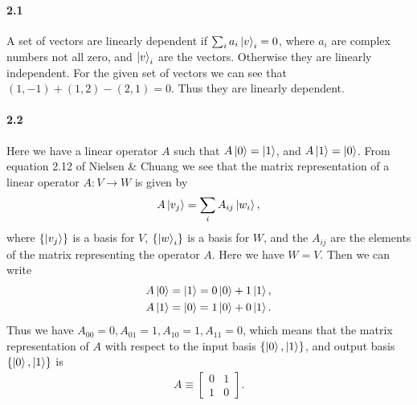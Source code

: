 
\paragraph{2.1}

A set of vectors are linearly dependent if \(\sum_{i} a_i \ket{v}_i = 0\),
where \(a_i\) are complex numbers not all zero, and \(\ket{v}_i\) are the
vectors. Otherwise they are linearly independent. For the given set of vectors
we can see that \((1, -1) + (1, 2) - (2, 1) = 0\). Thus they are linearly
dependent.

\paragraph{2.2}

Here we have a linear operator \(A\) such that \(A\ket{0} = \ket{1}\), and
\(A\ket{1} = \ket{0}\). From equation 2.12 of Nielsen \& Chuang we see that the
matrix representation of a linear operator \(A: V \rightarrow W\) is given by
\begin{align}
  \label{eq:linear-operator-matrix-representation}
  A\ket{v_j} = \sum_{i}A_{ij}\ket{w_i},
\end{align}
where \(\{\ket{v_j}\}\) is a basis for \(V\), \(\{\ket{w}_i\}\) is a basis for
\(W\), and the \(A_{ij}\) are the elements of the matrix representing the operator
\(A\). Here we have \(W = V\). Then we can write
\begin{align}
  \label{eq:A-matrix-representation}
  \begin{split}
    A\ket{0} = \ket{1} = 0\ket{0} + 1\ket{1}, \\
    A\ket{1} = \ket{0} = 1\ket{0} + 0\ket{1}.
  \end{split}
\end{align}
Thus we have \(A_{00} = 0, A_{01} = 1, A_{10} = 1, A_{11} = 0\), which means
that the matrix representation of \(A\) with respect to the input basis
\(\{\ket{0}, \ket{1}\}\), and output basis \(\{\ket{0}, \ket{1}\}\) is
\begin{align}
  \label{eq:A-matrix}
  A \equiv
  \begin{bmatrix}
    0 & 1 \\
    1 & 0
  \end{bmatrix}.
\end{align}

